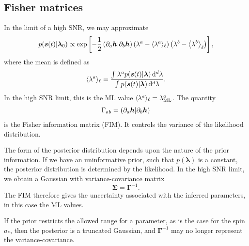 \subsection{Fisher matrices}\label{sec:Fisher}

In the limit of a high SNR, we may approximate \citep{Vallisneri2008}
\begin{equation}
p(\boldsymbol{s}(t)|\boldsymbol{\lambda}_0) \propto \exp\left[-\frac{1}{2}\left({\partial_a\boldsymbol{h}}\middle|{\partial_b\boldsymbol{h}}\right)\left(\lambda^a - \langle\lambda^a\rangle_\ell\right)\left(\lambda^b - \left\langle\lambda^b\right\rangle_\ell\right)\right],
\label{eq:LSA}
\end{equation}
where the mean is defined as
\begin{equation}
\langle\lambda^a\rangle_\ell = \frac{\int_{}^{}{\lambda^a p(\boldsymbol{s}(t)|\boldsymbol{\lambda})}\,\mathrm{d}{^d \lambda}}{\int_{}^{}{p(\boldsymbol{s}(t)|\boldsymbol{\lambda})}\,\mathrm{d}{^d \lambda}}.
\end{equation}
In the high SNR limit, this is the ML value $\langle\lambda^a\rangle_\ell = \lambda^a_\mathrm{ML}$. The quantity
\begin{equation}
\Gamma_{ab} = \left({\partial_a\boldsymbol{h}}\middle|{\partial_b\boldsymbol{h}}\right)
\label{eq:Fisher}
\end{equation}
is the Fisher information matrix (FIM). It controls the variance of the likelihood distribution.

The form of the posterior distribution depends upon the nature of the prior information. If we have an uninformative prior, such that $p(\boldsymbol{\lambda})$ is a constant, the posterior distribution is determined by the likelihood. In the high SNR limit, we obtain a Gaussian with variance-covariance matrix
\begin{equation}
\boldsymbol{\Sigma} = \boldsymbol{\Gamma}^{-1}.
\label{eq:InvFisher}
\end{equation}
The FIM therefore gives the uncertainty associated with the inferred parameters, in this case the ML values.

If the prior restricts the allowed range for a parameter, as is the case for the spin $a_\ast$, then the posterior is a truncated Gaussian, and $\boldsymbol{\Gamma}^{-1}$ may no longer represent the variance-covariance.

